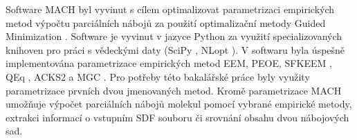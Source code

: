 Software MACH byl vyvinut s cílem optimalizovat parametrizaci empirických metod výpočtu parciálních nábojů za použití optimalizační metody Guided Minimization \cite{guided_m}. Software je vyvinut v jazyce Python za využití specializovaných knihoven pro práci s vědeckými daty (SciPy \cite{scipy}, NLopt \cite{nlopt}). V softwaru byla úspešně implementována parametrizace empirických metod EEM, PEOE, SFKEEM \cite{sfkeem}, QEq \cite{molsimul}, ACKS2 \cite{acsk2} a MGC \cite{mgc}. Pro potřeby této bakalářské práce byly využity parametrizace prvních dvou jmenovaných metod. Kromě parametrizace MACH umožňuje výpočet parciálních nábojů molekul pomocí vybrané empirické metody, extrakci informací o vstupním SDF souboru či srovnání obsahu dvou nábojových sad.
